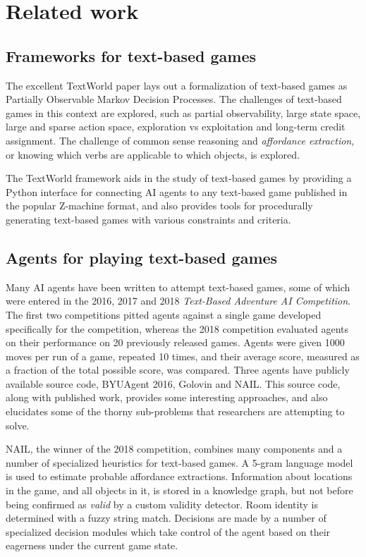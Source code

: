 \section{Related work}

\subsection{Frameworks for text-based games}

The excellent TextWorld paper lays out a formalization of text-based
games as Partially Observable Markov Decision Processes. The challenges
of text-based games in this context are explored, such as partial
observability, large state space, large and sparse action space,
exploration vs exploitation and long-term credit assignment. The
challenge of common sense reasoning and \emph{affordance extraction}, or
knowing which verbs are applicable to which objects, is explored.

The TextWorld framework aids in the study of text-based games by
providing a Python interface for connecting AI agents to any text-based
game published in the popular Z-machine format, and also provides tools
for procedurally generating text-based games with various constraints
and criteria\cite{cote_textworld_2019}.

\subsection{Agents for playing text-based games}

Many AI agents have been written to attempt text-based games, some of
which were entered in the 2016, 2017 and 2018 \emph{Text-Based Adventure
AI Competition}. The first two competitions pitted agents against a
single game developed specifically for the competition, whereas the 2018
competition evaluated agents on their performance on 20 previously
released games\cite{atkinson_text-based_2019}. Agents were given 1000
moves per run of a game, repeated 10 times, and their average score,
measured as a fraction of the total possible score, was compared.  Three
agents have publicly available source code, BYUAgent
2016\cite{ricks_byu-agent-2016_2019}, Golovin\cite{kostka2017text} and
NAIL\cite{hausknecht_nail_2019}. This source code, along with published
work, provides some interesting approaches, and also elucidates some of
the thorny sub-problems that researchers are attempting to solve.

NAIL, the winner of the 2018 competition, combines many components and a
number of specialized heuristics for text-based games. A 5-gram language
model is used to estimate probable affordance extractions. Information
about locations in the game, and all objects in it, is stored in a
knowledge graph, but not before being confirmed as \emph{valid} by a
custom validity detector. Room identity is determined with a fuzzy
string match. Decisions are made by a number of specialized decision
modules which take control of the agent based on their eagerness under
the current game state\cite{hausknecht_nail_2019}.

